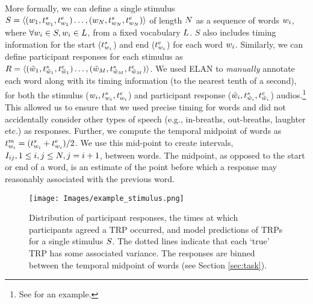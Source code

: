 More formally, we can define a single stimulus $S= \langle (w_{1},t_{w_{1}}^s,t_{w_{1}}^e) \ldots, (w_{N},t_{w_{N}}^s,t_{w_{N}}^e) \rangle$ of length $N$ as a sequence of words $w_{i}$, where $\forall w_{i} \in S, w_{i} \in L$, from a  fixed vocabulary $L$. $S$ also includes timing information for the start ($t_{w_{i}}^s$) and end ($t_{w_{i}}^e$) for each word $w_{i}$. Similarly, we can define participant responses for each stimulus as $R= \langle (\tilde{w}_{1},t_{\tilde{w}_{1}}^s,t_{\tilde{w}_{1}}^e) \ldots, (\tilde{w}_{M},t_{\tilde{w}_{M}}^s,t_{\tilde{w}_{M}}^e)\rangle$. We used ELAN to \emph{manually} annotate each word along with its timing information (to the nearest tenth of a second), for both the stimulus ($w_{i},t_{w_{i}}^s,t_{w_{i}}^e$) and participant response ($\tilde{w}_{i},t_{\tilde{w}_{i}}^s,t_{\tilde{w}_{i}}^e$) audios.\footnote{See  for an example.} This allowed us to ensure that we used precise timing for words and did not accidentally consider other types of speech (e.g., in-breaths, out-breaths, laughter etc.) as responses. Further, we compute the temporal midpoint of words as $t_{w_{i}}^m = (t_{w_{i}}^s + t_{w_{i}}^e)/2$. We use this mid-point to create intervals, $I_{ij}, 1 \leq i,j \leq N, j=i+1$, between words. The midpoint, as opposed to the start or end of a word, is an estimate of the point before which a response may reasonably associated with the previous word.



\begin{figure*}[hbt!]
    \centering
    \texttt{[image: Images/example\_stimulus.png]}
    \caption{Distribution of participant responses, the times at which participants agreed a TRP occurred, and model predictions of TRPs for a single stimulus $S$. The dotted lines indicate that each `true' TRP has some associated variance. The responses are binned between the temporal midpoint of words (see Section \ref{sec:task}).}
    \label{fig:enter-label}
\end{figure*}


